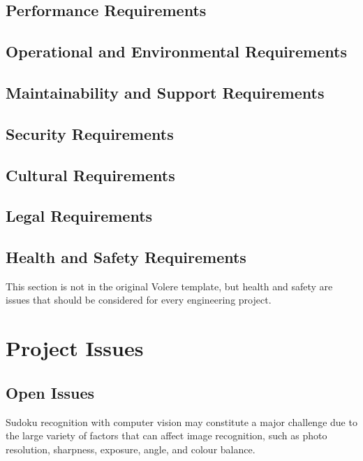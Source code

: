 \documentclass[11pt]{article}
\begin{document}
\subsection{Performance Requirements}

\subsection{Operational and Environmental Requirements}

\subsection{Maintainability and Support Requirements}

\subsection{Security Requirements}

\subsection{Cultural Requirements}

\subsection{Legal Requirements}

\subsection{Health and Safety Requirements}

This section is not in the original Volere template, but health and safety are
issues that should be considered for every engineering project.

\newpage

\section{Project Issues}

\subsection{Open Issues}
Sudoku recognition with computer vision may constitute a major challenge due to the large variety of factors that can affect image recognition, such as photo resolution, sharpness, exposure, angle, and colour balance. 
\end{document}
